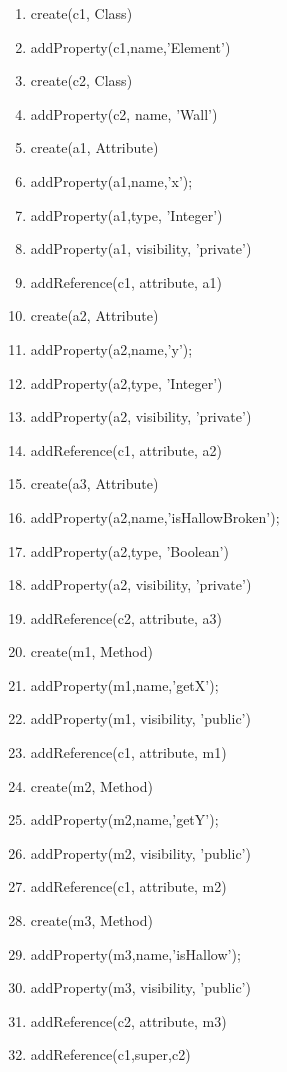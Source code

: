 \documentclass[a4paper,14pt]{article}
\begin{document}
\begin{enumerate}
\item create(c1, Class)
\item addProperty(c1,name,'Element')
\item create(c2, Class)
\item addProperty(c2, name, 'Wall')
\item create(a1, Attribute)
\item addProperty(a1,name,'x');
\item addProperty(a1,type, 'Integer')
\item addProperty(a1, visibility, 'private')
\item addReference(c1, attribute, a1)

\item create(a2, Attribute)
\item addProperty(a2,name,'y');
\item addProperty(a2,type, 'Integer')
\item addProperty(a2, visibility, 'private')
\item addReference(c1, attribute, a2)

\item create(a3, Attribute)
\item addProperty(a2,name,'isHallowBroken');
\item addProperty(a2,type, 'Boolean')
\item addProperty(a2, visibility, 'private')
\item addReference(c2, attribute, a3)

\item create(m1, Method)
\item addProperty(m1,name,'getX');
\item addProperty(m1, visibility, 'public')
\item addReference(c1, attribute, m1)


\item create(m2, Method)
\item addProperty(m2,name,'getY');
\item addProperty(m2, visibility, 'public')
\item addReference(c1, attribute, m2)


\item create(m3, Method)
\item addProperty(m3,name,'isHallow');
\item addProperty(m3, visibility, 'public')
\item addReference(c2, attribute, m3)

\item addReference(c1,super,c2)
\end{enumerate}
\end{document}
